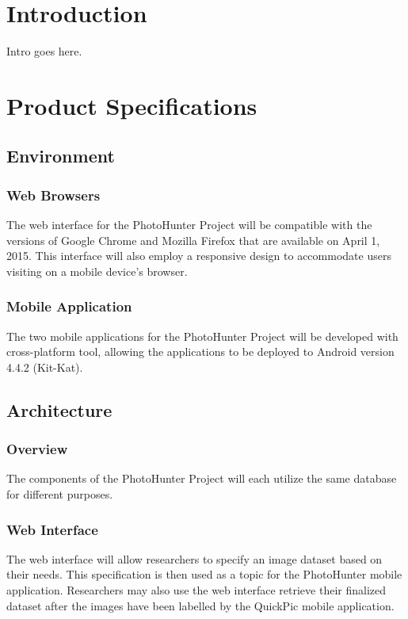 \documentclass{article}
\begin{document}
\section{Introduction}
Intro goes here.

\section{Product Specifications}

\subsection{Environment}

\subsubsection{Web Browsers}
The web interface for the PhotoHunter Project will be compatible with the
versions of Google Chrome and Mozilla Firefox that are available on April 1,
2015. This interface will also employ a responsive design to accommodate users
visiting on a mobile device's browser.

\subsubsection{Mobile Application}
The two mobile applications for the PhotoHunter Project will be developed with
cross-platform tool, allowing the applications to be deployed to Android
version 4.4.2 (Kit-Kat).

\subsection{Architecture}

\subsubsection{Overview}
The components of the PhotoHunter Project will each utilize the same database
for different purposes.

\subsubsection{Web Interface}
The web interface will allow researchers to specify an image dataset based on
their needs. This specification is then used as a topic for the PhotoHunter
mobile application. Researchers may also use the web interface retrieve their
finalized dataset after the images have been labelled by the QuickPic mobile
application.
\end{document}
